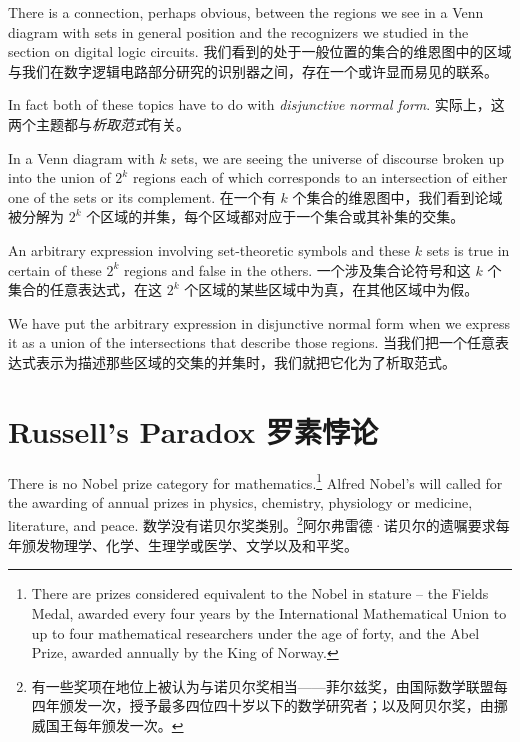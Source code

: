 There is a connection, perhaps obvious, between the regions we
see in a Venn diagram with sets in general position and the recognizers
we studied in the section on digital logic circuits.
我们看到的处于一般位置的集合的维恩图中的区域与我们在数字逻辑电路部分研究的识别器之间，存在一个或许显而易见的联系。

In fact both
of these topics have to do with \emph{disjunctive normal form}.
实际上，这两个主题都与\emph{析取范式}有关。

In a Venn diagram with $k$ sets, we are seeing the universe
of discourse broken up into the union of $2^k$ regions each of which 
corresponds to an intersection of either one of the sets or its complement.
在一个有 $k$ 个集合的维恩图中，我们看到论域被分解为 $2^k$ 个区域的并集，每个区域都对应于一个集合或其补集的交集。

An arbitrary expression involving set-theoretic symbols and these $k$ sets
is true in certain of these $2^k$ regions and false in the others.
一个涉及集合论符号和这 $k$ 个集合的任意表达式，在这 $2^k$ 个区域的某些区域中为真，在其他区域中为假。

We have put the arbitrary expression in disjunctive normal form when
we express it as a union of the intersections that describe those regions.
当我们把一个任意表达式表示为描述那些区域的交集的并集时，我们就把它化为了析取范式。
\vspace{.1in}


 

\clearpage 




\newpage

\section{Russell's Paradox 罗素悖论}
\label{sec:russell}

There is no Nobel prize category for mathematics.\footnote{There are prizes
considered equivalent to the Nobel in stature -- the Fields Medal, awarded every four years by the International Mathematical Union to up to four mathematical researchers under the age of forty, and the Abel Prize, awarded annually by the King of Norway.}   Alfred Nobel's will
called for the awarding of annual prizes in physics, chemistry, physiology 
or medicine, literature, and peace.
数学没有诺贝尔奖类别。\footnote{有一些奖项在地位上被认为与诺贝尔奖相当——菲尔兹奖，由国际数学联盟每四年颁发一次，授予最多四位四十岁以下的数学研究者；以及阿贝尔奖，由挪威国王每年颁发一次。}阿尔弗雷德·诺贝尔的遗嘱要求每年颁发物理学、化学、生理学或医学、文学以及和平奖。

